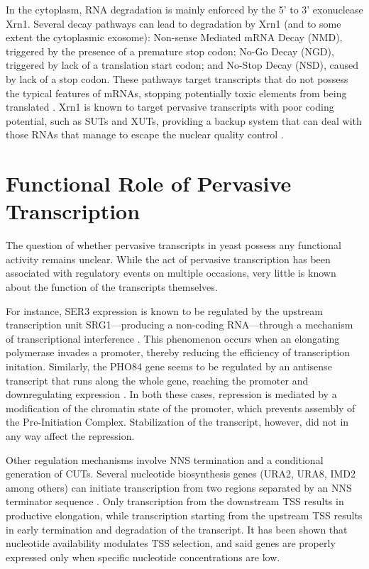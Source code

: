 In the cytoplasm, RNA degradation is mainly enforced by the 5' to 3' exonuclease Xrn1. 
Several decay pathways can lead to degradation by Xrn1 (and to some extent the cytoplasmic exosome): Non-sense Mediated mRNA Decay (NMD), triggered by the presence of a premature stop codon; No-Go Decay (NGD), triggered by lack of a translation start codon; and No-Stop Decay (NSD), caused by lack of a stop codon.
These pathways target transcripts that do not possess the typical features of mRNAs, stopping potentially toxic elements from being translated \cite[for review see][]{houseley:2009:many}. 
Xrn1 is known to target pervasive transcripts with poor coding potential, such as SUTs and XUTs, providing a backup system that can deal with those RNAs that manage to escape the nuclear quality control \cite{malabat:2015:quality}.

\section{Functional Role of Pervasive Transcription}

The question of whether pervasive transcripts in yeast possess any functional activity remains unclear.
While the act of pervasive transcription has been associated with regulatory events on multiple occasions, very little is known about the function of the transcripts themselves. 

For instance, SER3 expression is known to be regulated by the upstream transcription unit SRG1—producing a non-coding RNA—through a mechanism of transcriptional interference \cite{martens:2004:intergenic}. 
This phenomenon occurs when an elongating polymerase invades a promoter, thereby reducing the efficiency of transcription initation. Similarly, the PHO84 gene seems to be regulated by an antisense transcript that runs along the whole gene, reaching the promoter and downregulating expression \cite{castelnuovo:2013:bimodal}. 
In both these cases, repression is mediated by a modification of the chromatin state of the promoter, which prevents assembly of the Pre-Initiation Complex. Stabilization of the transcript, however, did not in any way affect the repression.

Other regulation mechanisms involve NNS termination and a conditional generation of CUTs. Several nucleotide biosynthesis genes (URA2, URA8, IMD2 among others) can initiate transcription from two regions separated by an NNS terminator sequence \cite{jenks:2008:properties, thiebaut:2008:futile}. 
Only transcription from the downstream TSS results in productive elongation, while transcription starting from the upstream TSS results in early termination and degradation of the transcript. 
It has been shown that nucleotide availability modulates TSS selection, and said genes are properly expressed only when specific nucleotide concentrations are low.


\clearpage



